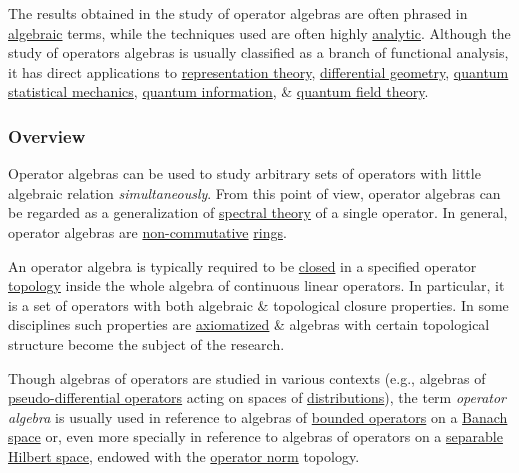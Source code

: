 \documentclass{article}
\begin{document}
The results obtained in the study of operator algebras are often phrased in \href{https://en.wikipedia.org/wiki/Algebra}{algebraic} terms, while the techniques used are often highly \href{https://en.wikipedia.org/wiki/Mathematical_analysis}{analytic}. Although the study of operators algebras is usually classified as a branch of functional analysis, it has direct applications to \href{https://en.wikipedia.org/wiki/Representation_theory}{representation theory}, \href{https://en.wikipedia.org/wiki/Differential_geometry}{differential geometry}, \href{https://en.wikipedia.org/wiki/Quantum_statistical_mechanics}{quantum statistical mechanics}, \href{https://en.wikipedia.org/wiki/Quantum_information}{quantum information}, \& \href{https://en.wikipedia.org/wiki/Quantum_field_theory}{quantum field theory}.

\subsubsection{Overview}
Operator algebras can be used to study arbitrary sets of operators with little algebraic relation {\it simultaneously}. From this point of view, operator algebras can be regarded as a generalization of \href{https://en.wikipedia.org/wiki/Spectral_theory}{spectral theory} of a single operator. In general, operator algebras are \href{https://en.wikipedia.org/wiki/Noncommutative_ring}{non-commutative} \href{https://en.wikipedia.org/wiki/Ring_(mathematics)}{rings}.

An operator algebra is typically required to be \href{https://en.wikipedia.org/wiki/Closure_(mathematics)}{closed} in a specified operator \href{https://en.wikipedia.org/wiki/Topology}{topology} inside the whole algebra of continuous linear operators. In particular, it is a set of operators with both algebraic \& topological closure properties. In some disciplines such properties are \href{https://en.wikipedia.org/wiki/Axiom}{axiomatized} \& algebras with certain topological structure become the subject of the research.

Though algebras of operators are studied in various contexts (e.g., algebras of \href{https://en.wikipedia.org/wiki/Pseudo-differential_operator}{pseudo-differential operators} acting on spaces of \href{https://en.wikipedia.org/wiki/Distribution_(mathematics)}{distributions}), the term {\it operator algebra} is usually used in reference to algebras of \href{https://en.wikipedia.org/wiki/Bounded_operator}{bounded operators} on a \href{https://en.wikipedia.org/wiki/Banach_space}{Banach space} or, even more specially in reference to algebras of operators on a \href{https://en.wikipedia.org/wiki/Separable_space}{separable} \href{https://en.wikipedia.org/wiki/Hilbert_space}{Hilbert space}, endowed with the \href{https://en.wikipedia.org/wiki/Operator_norm}{operator norm} topology.
\end{document}
